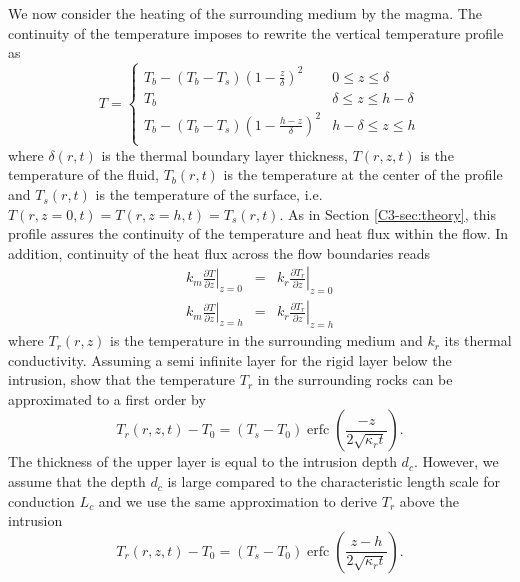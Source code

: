 We now  consider the heating of  the surrounding medium by  the magma.
The  continuity of  the temperature  imposes to  rewrite the  vertical
temperature profile as
\begin{equation}
  T=
  \begin{cases}
    T_b - (T_b-T_s)(1-\frac{z}{\delta})^2 & 0 \le z\le \delta \\
    T_b & \delta \le z\le h-\delta \\
    T_b - (T_b-T_s)(1-\frac{h-z}{\delta})^2 & h-\delta \le z\le h\\
  \end{cases}
  \label{C4-Temperature}
\end{equation}
where  $\delta(r,t)$   is  the   thermal  boundary   layer  thickness,
$T(r,z,t)$  is  the  temperature  of  the  fluid,  $T_b(r,t)$  is  the
temperature  at  the center  of  the  profile  and $T_s(r,t)$  is  the
temperature  of the  surface, i.e.   $T(r,z=0,t)=T(r,z=h,t)=T_s(r,t)$.
As in Section \ref{C3-sec:theory}, this profile assures the continuity
of  the temperature  and  heat  flux within  the  flow.  In  addition,
continuity of the heat flux across the flow boundaries reads
\begin{eqnarray}
  k_m\left.\frac{\partial                                    T}{\partial
  z}\right|_{z=0}&=&k_r\left.\frac{\partial              T_r}{\partial
                     z}\right|_{z=0}  \label{C4-Flux1}\\
  k_m\left.\frac{\partial                                  T}{\partial
  z}\right|_{z=h}&=&k_r\left.\frac{\partial            T_r}{\partial
                     z}\right|_{z=h}
                     \label{C4-Flux2}
\end{eqnarray}
where  $T_r(r,z)$ is  the temperature  in the  surrounding medium  and
$k_r$ its  thermal conductivity.  Assuming  a semi infinite  layer for
the rigid layer below  the intrusion, \citet{Carslaw:1959wf} show that
the temperature $T_r$ in the  surrounding rocks can be approximated to
a first order by
\begin{equation}
  T_r(r,z,t)-T_0=(T_{s}-T_0)\operatorname{erfc}{\left(\frac{-z}{2\sqrt{\kappa_r t}}\right)}.
  \label{C4-eq22}
\end{equation}
The  thickness of  the upper  layer is  equal to  the intrusion  depth
$d_c$. However,  we assume that the  depth $d_c$ is large  compared to
the characteristic  length scale for  conduction $L_c$ and we  use the
same approximation to derive $T_r$ above the intrusion
\begin{equation}
  T_r(r,z,t)-T_0=(T_{s}-T_0)\operatorname{erfc}{\left(\frac{z-h}{2\sqrt{\kappa_r t}}\right)}.
  \label{C4-eq11}
\end{equation}
